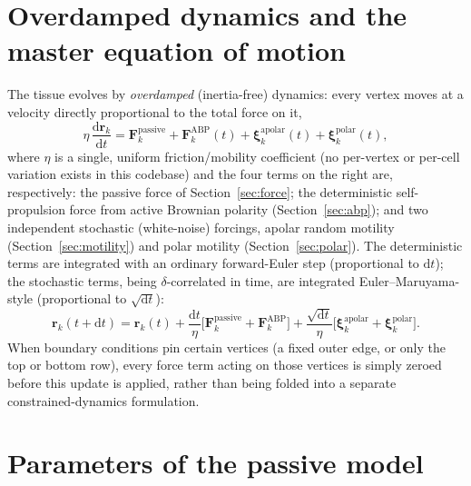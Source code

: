 \documentclass[11pt]{article}
\newcommand{\rvec}{\mathbf{r}}
\newcommand{\ord}{\mathrm{d}}
\begin{document}
\section{Overdamped dynamics and the master equation of motion}
\label{sec:dynamics}

The tissue evolves by \emph{overdamped} (inertia-free) dynamics: every vertex moves at
a velocity directly proportional to the total force on it,
\begin{equation}
  \eta\, \frac{\ord \rvec_k}{\ord t} = \mathbf{F}_k^{\text{passive}}
  + \mathbf{F}_k^{\text{ABP}}(t)
  + \boldsymbol{\xi}_k^{\text{apolar}}(t)
  + \boldsymbol{\xi}_k^{\text{polar}}(t),
  \label{eq:eom}
\end{equation}
where $\eta$ is a single, uniform friction/mobility coefficient (no per-vertex or
per-cell variation exists in this codebase) and the four terms on the right are,
respectively: the passive force of Section~\ref{sec:force}; the deterministic
self-propulsion force from active Brownian polarity (Section~\ref{sec:abp}); and two
independent stochastic (white-noise) forcings, apolar random motility
(Section~\ref{sec:motility}) and polar motility (Section~\ref{sec:polar}). The deterministic terms are
integrated with an ordinary forward-Euler step (proportional to $\ord t$); the
stochastic terms, being $\delta$-correlated in time, are integrated
Euler--Maruyama-style (proportional to $\sqrt{\ord t}$):
\begin{equation}
  \rvec_k(t+\ord t) = \rvec_k(t)
    + \frac{\ord t}{\eta}\Big[\mathbf{F}_k^{\text{passive}} + \mathbf{F}_k^{\text{ABP}}\Big]
    + \frac{\sqrt{\ord t}}{\eta}\Big[\boldsymbol{\xi}_k^{\text{apolar}} + \boldsymbol{\xi}_k^{\text{polar}}\Big].
  \label{eq:eom-discrete}
\end{equation}
When boundary conditions pin certain vertices (a fixed outer edge, or only the top or
bottom row), every force term acting on those vertices is simply zeroed before this
update is applied, rather than being folded into a separate constrained-dynamics
formulation.

\section{Parameters of the passive model}
\label{sec:parameters}
\end{document}
